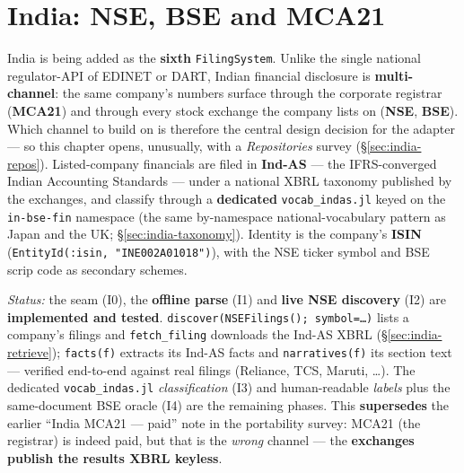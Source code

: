 \documentclass[11pt,a4paper]{report}
\begin{document}
\chapter{India: NSE, BSE and MCA21}
\label{sys:india}

India is being added as the \textbf{sixth} \texttt{FilingSystem}. Unlike the single national regulator-API
of EDINET or DART, Indian financial disclosure is \textbf{multi-channel}: the same company's numbers surface
through the corporate registrar (\textbf{MCA21}) and through every stock exchange the company lists on
(\textbf{NSE}, \textbf{BSE}). Which channel to build on is therefore the central design decision for the
adapter --- so this chapter opens, unusually, with a \emph{Repositories} survey (\S\ref{sec:india-repos}).
Listed-company financials are filed in \textbf{Ind-AS} --- the IFRS-converged Indian Accounting Standards ---
under a national XBRL taxonomy published by the exchanges, and classify through a \textbf{dedicated}
\texttt{vocab\_indas.jl} keyed on the \texttt{in-bse-fin} namespace (the same by-namespace national-vocabulary
pattern as Japan and the UK; \S\ref{sec:india-taxonomy}). Identity is the company's \textbf{ISIN}
(\texttt{EntityId(:isin,\ "INE002A01018")}), with the NSE ticker symbol and BSE scrip code as secondary
schemes.

\emph{Status:} the seam (I0), the \textbf{offline parse} (I1) and \textbf{live NSE discovery} (I2) are
\textbf{implemented and tested}. \texttt{discover(NSEFilings();\ symbol=\ldots)} lists a company's filings
and \texttt{fetch\_filing} downloads the Ind-AS XBRL (\S\ref{sec:india-retrieve}); \texttt{facts(f)} extracts
its Ind-AS facts and \texttt{narratives(f)} its section text --- verified end-to-end against real filings
(Reliance, TCS, Maruti, \ldots). The dedicated \texttt{vocab\_indas.jl} \emph{classification} (I3) and
human-readable \emph{labels} plus the same-document BSE oracle (I4) are the remaining phases. This
\textbf{supersedes} the earlier ``India MCA21 --- paid'' note in the portability survey: MCA21 (the
registrar) is indeed paid, but that is the \emph{wrong} channel --- the \textbf{exchanges publish the
results XBRL keyless}.
\end{document}
